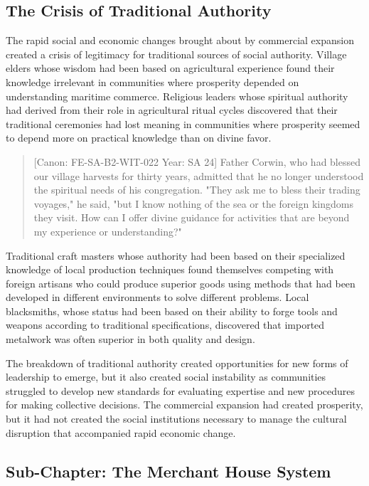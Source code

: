 \subsection{The Crisis of Traditional
Authority}\label{the-crisis-of-traditional-authority}

The rapid social and economic changes brought about by commercial
expansion created a crisis of legitimacy for traditional sources of
social authority. Village elders whose wisdom had been based on
agricultural experience found their knowledge irrelevant in communities
where prosperity depended on understanding maritime commerce. Religious
leaders whose spiritual authority had derived from their role in
agricultural ritual cycles discovered that their traditional ceremonies
had lost meaning in communities where prosperity seemed to depend more
on practical knowledge than on divine favor.

\begin{quote}
{[}Canon: FE-SA-B2-WIT-022 \textbar{} Year: SA 24{]} Father Corwin, who
had blessed our village harvests for thirty years, admitted that he no
longer understood the spiritual needs of his congregation. "They ask me
to bless their trading voyages," he said, "but I know nothing of the sea
or the foreign kingdoms they visit. How can I offer divine guidance for
activities that are beyond my experience or understanding?"
\end{quote}

Traditional craft masters whose authority had been based on their
specialized knowledge of local production techniques found themselves
competing with foreign artisans who could produce superior goods using
methods that had been developed in different environments to solve
different problems. Local blacksmiths, whose status had been based on
their ability to forge tools and weapons according to traditional
specifications, discovered that imported metalwork was often superior in
both quality and design.

The breakdown of traditional authority created opportunities for new
forms of leadership to emerge, but it also created social instability as
communities struggled to develop new standards for evaluating expertise
and new procedures for making collective decisions. The commercial
expansion had created prosperity, but it had not created the social
institutions necessary to manage the cultural disruption that
accompanied rapid economic change.

\subsection{Sub-Chapter: The Merchant House
System}\label{sub-chapter-the-merchant-house-system}

